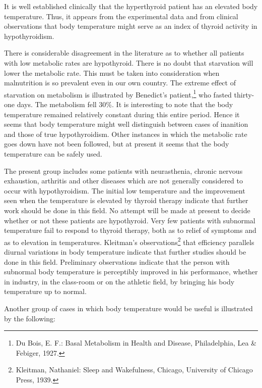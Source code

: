 \documentclass[10pt, letterpaper]{memoir}
\begin{document}
\begin{multicols}{2}
It is well established clinically that the hyperthyroid patient has an elevated body temperature. Thus, it appears from the experimental data and from clinical observations that body temperature might serve as an index of thyroid activity in hypothyroidism.

There is considerable disagreement in the literature as to whether all patients with low metabolic rates are hypothyroid. There is no doubt that starvation will lower the metabolic rate. This must be taken into consideration when malnutrition is so prevalent even in our own country. The extreme effect of starvation on metabolism is illustrated by Benedict's patient,\footnote{Du Bois, E. F.: Basal Metabolism in Health and Disease, Philadelphia, Lea \& Febiger, 1927.} who fasted thirty-one days. The metabolism fell 30\%. It is interesting to note that the body temperature remained relatively constant during this entire period. Hence it seems that body temperature might well distinguish between cases of inanition and those of true hypothyroidism. Other instances in which the metabolic rate goes down have not been followed, but at present it seems that the body temperature can be safely used.

The present group includes some patients with neurasthenia, chronic nervous exhaustion, arthritis and other diseases which are not generally considered to occur with hypothyroidism. The initial low temperature and the improvement seen when the temperature is elevated by thyroid therapy indicate that further work should be done in this field. No attempt will be made at present to decide whether or not these patients are hypothyroid. Very few patients with subnormal temperature fail to respond to thyroid therapy, both as to relief of symptoms and as to elevation in temperatures. Kleitman's observations\footnote{Kleitman, Nathaniel: Sleep and Wakefulness, Chicago, University of Chicago Press, 1939.} that efficiency parallels diurnal variations in body temperature indicate that further studies should be done in this field. Preliminary observations indicate that the person with subnormal body temperature is perceptibly improved in his performance, whether in industry, in the class-room or on the athletic field, by bringing his body temperature up to normal.

Another group of cases in which body temperature would be useful is illustrated by the following:


\end{multicols}
\end{document}
